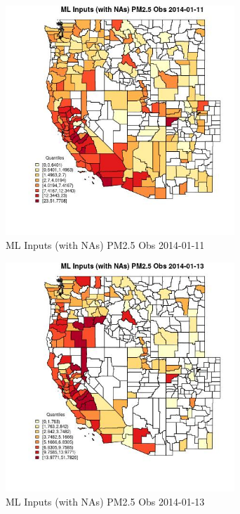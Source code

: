 \begin{figure} 
\centering  
\includegraphics[width=0.77\textwidth]{Code_Outputs/Report_ML_input_PM25_Step4_part_e_de_duplicated_aveswNAs_CountyPM25_ObsMean2014-01-11_2014-01-11.jpg} 
\caption{\label{fig:Report_ML_input_PM25_Step4_part_e_de_duplicated_aveswNAsCountyPM25_ObsMean2014-01-11_2014-01-11}ML Inputs (with NAs) PM2.5 Obs 2014-01-11} 
\end{figure} 
 

\begin{figure} 
\centering  
\includegraphics[width=0.77\textwidth]{Code_Outputs/Report_ML_input_PM25_Step4_part_e_de_duplicated_aveswNAs_CountyPM25_ObsMean2014-01-13_2014-01-13.jpg} 
\caption{\label{fig:Report_ML_input_PM25_Step4_part_e_de_duplicated_aveswNAsCountyPM25_ObsMean2014-01-13_2014-01-13}ML Inputs (with NAs) PM2.5 Obs 2014-01-13} 
\end{figure} 
 

